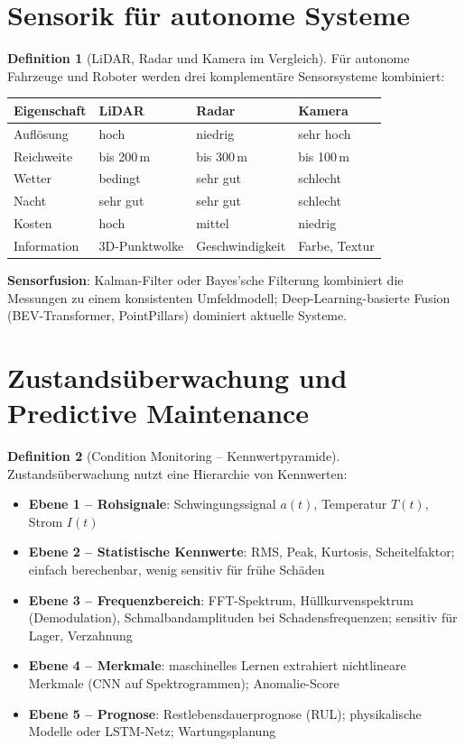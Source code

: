 ﻿\documentclass[a4paper,12pt]{report}
\theoremstyle{definition}
\newtheorem{definition}{Definition}
\begin{document}
\section{Sensorik für autonome Systeme}

\begin{definition}[LiDAR, Radar und Kamera im Vergleich]
Für autonome Fahrzeuge und Roboter werden drei komplementäre Sensorsysteme kombiniert:
\begin{center}
\begin{tabular}{llll}
\toprule
Eigenschaft & LiDAR & Radar & Kamera \\
\midrule
Auflösung & hoch & niedrig & sehr hoch \\
Reichweite & bis 200\,m & bis 300\,m & bis 100\,m \\
Wetter & bedingt & sehr gut & schlecht \\
Nacht & sehr gut & sehr gut & schlecht \\
Kosten & hoch & mittel & niedrig \\
Information & 3D-Punktwolke & Geschwindigkeit & Farbe, Textur \\
\bottomrule
\end{tabular}
\end{center}
\textbf{Sensorfusion}: Kalman-Filter oder Bayes'sche Filterung kombiniert
die Messungen zu einem konsistenten Umfeldmodell; Deep-Learning-basierte
Fusion (BEV-Transformer, PointPillars) dominiert aktuelle Systeme.
\end{definition}

\section{Zustandsüberwachung und Predictive Maintenance}

\begin{definition}[Condition Monitoring -- Kennwertpyramide]
Zustandsüberwachung nutzt eine Hierarchie von Kennwerten:
\begin{itemize}
    \item[-] \textbf{Ebene 1 -- Rohsignale}: Schwingungssignal $a(t)$, Temperatur $T(t)$, Strom $I(t)$
    \item[-] \textbf{Ebene 2 -- Statistische Kennwerte}: RMS, Peak, Kurtosis, Scheitelfaktor;
          einfach berechenbar, wenig sensitiv für frühe Schäden
    \item[-] \textbf{Ebene 3 -- Frequenzbereich}: FFT-Spektrum, Hüllkurvenspektrum (Demodulation),
          Schmalbandamplituden bei Schadensfrequenzen; sensitiv für Lager, Verzahnung
    \item[-] \textbf{Ebene 4 -- Merkmale}: maschinelles Lernen extrahiert
          nichtlineare Merkmale (CNN auf Spektrogrammen); Anomalie-Score
    \item[-] \textbf{Ebene 5 -- Prognose}: Restlebensdauerprognose (RUL);
          physikalische Modelle oder LSTM-Netz; Wartungsplanung
\end{itemize}
\end{definition}
\end{document}
